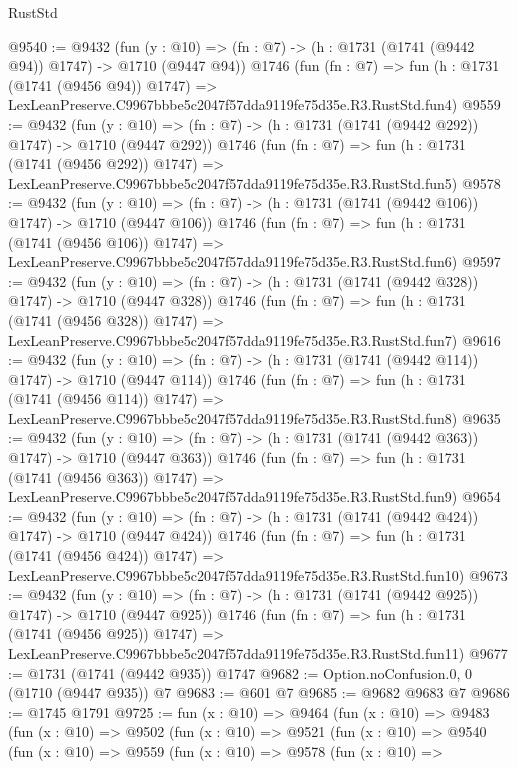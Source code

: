 \begin{lexlean}{RustStd}
\begin{coremodule}
@9540 := @9432
    (fun (y : @10) => (fn : @7) -> (h : @1731 (@1741 (@9442 @94)) @1747) -> @1710 (@9447 @94))
    @1746
    (fun (fn : @7) =>
    fun (h : @1731 (@1741 (@9456 @94)) @1747) =>
    LexLeanPreserve.C9967bbbe5c2047f57dda9119fe75d35e.R3.RustStd.fun4)
@9559 := @9432
    (fun (y : @10) => (fn : @7) -> (h : @1731 (@1741 (@9442 @292)) @1747) -> @1710 (@9447 @292))
    @1746
    (fun (fn : @7) =>
    fun (h : @1731 (@1741 (@9456 @292)) @1747) =>
    LexLeanPreserve.C9967bbbe5c2047f57dda9119fe75d35e.R3.RustStd.fun5)
@9578 := @9432
    (fun (y : @10) => (fn : @7) -> (h : @1731 (@1741 (@9442 @106)) @1747) -> @1710 (@9447 @106))
    @1746
    (fun (fn : @7) =>
    fun (h : @1731 (@1741 (@9456 @106)) @1747) =>
    LexLeanPreserve.C9967bbbe5c2047f57dda9119fe75d35e.R3.RustStd.fun6)
@9597 := @9432
    (fun (y : @10) => (fn : @7) -> (h : @1731 (@1741 (@9442 @328)) @1747) -> @1710 (@9447 @328))
    @1746
    (fun (fn : @7) =>
    fun (h : @1731 (@1741 (@9456 @328)) @1747) =>
    LexLeanPreserve.C9967bbbe5c2047f57dda9119fe75d35e.R3.RustStd.fun7)
@9616 := @9432
    (fun (y : @10) => (fn : @7) -> (h : @1731 (@1741 (@9442 @114)) @1747) -> @1710 (@9447 @114))
    @1746
    (fun (fn : @7) =>
    fun (h : @1731 (@1741 (@9456 @114)) @1747) =>
    LexLeanPreserve.C9967bbbe5c2047f57dda9119fe75d35e.R3.RustStd.fun8)
@9635 := @9432
    (fun (y : @10) => (fn : @7) -> (h : @1731 (@1741 (@9442 @363)) @1747) -> @1710 (@9447 @363))
    @1746
    (fun (fn : @7) =>
    fun (h : @1731 (@1741 (@9456 @363)) @1747) =>
    LexLeanPreserve.C9967bbbe5c2047f57dda9119fe75d35e.R3.RustStd.fun9)
@9654 := @9432
    (fun (y : @10) => (fn : @7) -> (h : @1731 (@1741 (@9442 @424)) @1747) -> @1710 (@9447 @424))
    @1746
    (fun (fn : @7) =>
    fun (h : @1731 (@1741 (@9456 @424)) @1747) =>
    LexLeanPreserve.C9967bbbe5c2047f57dda9119fe75d35e.R3.RustStd.fun10)
@9673 := @9432
    (fun (y : @10) => (fn : @7) -> (h : @1731 (@1741 (@9442 @925)) @1747) -> @1710 (@9447 @925))
    @1746
    (fun (fn : @7) =>
    fun (h : @1731 (@1741 (@9456 @925)) @1747) =>
    LexLeanPreserve.C9967bbbe5c2047f57dda9119fe75d35e.R3.RustStd.fun11)
@9677 := @1731 (@1741 (@9442 @935)) @1747
@9682 := Option.noConfusion.{0, 0} (@1710 (@9447 @935)) @7
@9683 := @601 @7
@9685 := @9682 @9683 @7
@9686 := @1745 @1791
@9725 := fun (x : @10) =>
  @9464
    (fun (x : @10) =>
    @9483
      (fun (x : @10) =>
      @9502
        (fun (x : @10) =>
        @9521
          (fun (x : @10) =>
          @9540
            (fun (x : @10) =>
            @9559
              (fun (x : @10) =>
              @9578
                (fun (x : @10) =>

\end{coremodule}
\end{lexlean}
